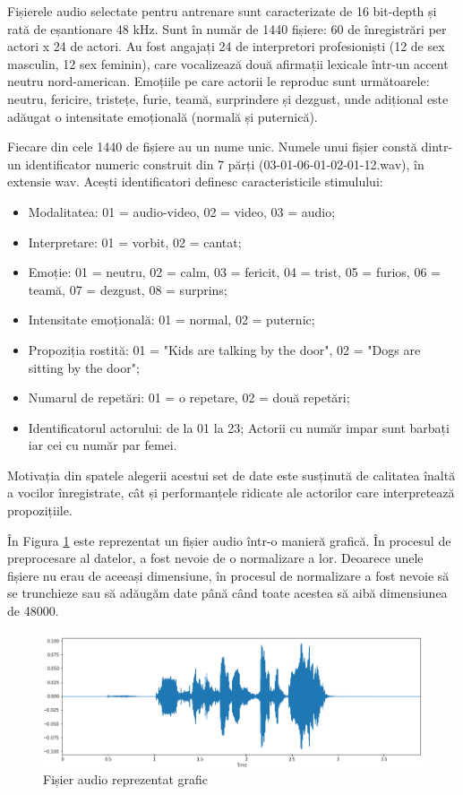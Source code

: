 \documentclass[a4paper, 12pt]{report}
\begin{document}
	Fișierele audio selectate pentru antrenare sunt caracterizate de 16 bit-depth și rată de eșantionare 48 kHz. Sunt în număr de 1440 fișiere: 60 de înregistrări per actori x 24 de actori. Au fost angajați 24 de interpretori profesioniști (12 de sex masculin, 12 sex feminin), care vocalizează două afirmații lexicale într-un accent neutru nord-american. Emoțiile pe care actorii le reproduc sunt următoarele: neutru, fericire, tristețe, furie, teamă, surprindere și dezgust, unde adițional este adăugat o intensitate emoțională (normală și puternică).

	Fiecare din cele 1440 de fișiere au un nume unic. Numele unui fișier constă dintr-un identificator numeric construit din 7 părți (03-01-06-01-02-01-12.wav), în extensie wav. Acești identificatori definesc caracteristicile stimulului:
	
	\begin{itemize}
		\item Modalitatea: 01 = audio-video, 02 = video, 03 = audio;
		\item Interpretare: 01 = vorbit, 02 = cantat;
		\item Emoție: 01 = neutru, 02 = calm, 03 = fericit, 04 = trist, 05 = furios, 06 = teamă, 07 = dezgust, 08 = surprins;
		\item Intensitate emoțională: 01 = normal, 02 = puternic;
		\item Propoziția rostită: 01 = "Kids are talking by the door", 02 = "Dogs are sitting by the door";
		\item Numarul de repetări: 01 = o repetare, 02 = două repetări;
		\item Identificatorul actorului: de la 01 la 23; Actorii cu număr impar sunt barbați iar cei cu număr par femei.
	\end{itemize}

	Motivația din spatele alegerii acestui set de date este susținută de calitatea înaltă a vocilor înregistrate, cât și performanțele ridicate ale actorilor care interpretează propozițiile.
	
	În Figura \ref{fig:audio_plot} este reprezentat un fișier audio într-o manieră grafică. În procesul de preprocesare al datelor, a fost nevoie de o normalizare a lor. Deoarece unele fișiere nu erau de aceeași dimensiune, în procesul de normalizare a fost nevoie să se trunchieze sau să adăugăm date până când toate acestea să aibă dimensiunea de 48000.
	
	\begin{figure}[H]
		\begin{center}
			\includegraphics[scale=0.6]{images/audio_plot.png}
		\end{center}
		\caption{Fișier audio reprezentat grafic}
		\label{fig:audio_plot}
	\end{figure}
	
\end{document}
